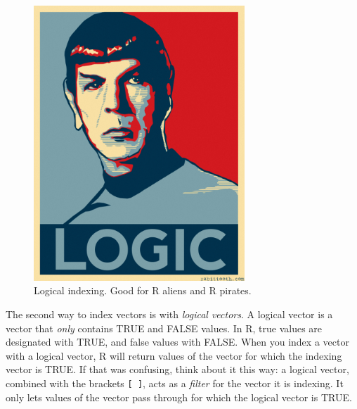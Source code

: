 \documentclass[]{book}
\theoremstyle{definition}
\theoremstyle{definition}
\theoremstyle{remark}
\begin{document}
\begin{figure}

{\centering \includegraphics[width=300px]{images/logic} 

}

\caption{Logical indexing. Good for R aliens and R pirates.}\label{fig:unnamed-chunk-135}
\end{figure}

The second way to index vectors is with \emph{logical vectors}. A
logical vector is a vector that \emph{only} contains TRUE and FALSE
values. In R, true values are designated with TRUE, and false values
with FALSE. When you index a vector with a logical vector, R will return
values of the vector for which the indexing vector is TRUE. If that was
confusing, think about it this way: a logical vector, combined with the
brackets \texttt{{[}\ {]}}, acts as a \emph{filter} for the vector it is
indexing. It only lets values of the vector pass through for which the
logical vector is TRUE.
\end{document}
